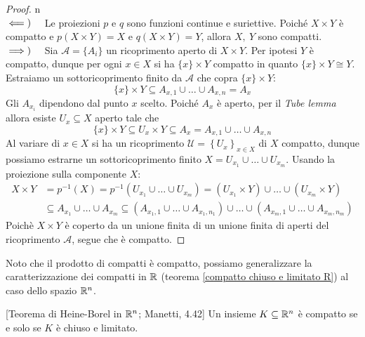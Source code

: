 \begin{proof}{n}~{}\\
	$\impliedby)\quad $ Le proiezioni $p$ e $q$ sono funzioni continue e suriettive. Poiché $X\times Y$ è compatto e $p\left(X\times Y\right)=X$ e $q\left(X\times Y\right)=Y$, allora $X,\ Y$ sono compatti. \\
	$\implies)\quad $ Sia $\mathcal{A}=\{A_i\}$ un ricoprimento aperto di $X\times Y$. Per ipotesi $Y$ è compatto, dunque per ogni $x\in X$ si ha $\{x\}\times Y$ compatto in quanto $\{x\}\times Y\cong Y$.
	Estraiamo un sottoricoprimento finito da $\mathcal{A}$ che copra $\{x\}\times Y$:
	\begin{equation*}
		\{x\}\times Y\subseteq A_{x,1}\cup\ldots\cup A_{x,n}=A_x
	\end{equation*}
	Gli $A_{x_i}$ dipendono dal punto $x$ scelto. Poiché $A_x$ è aperto, per il \textit{Tube lemma} allora esiste $U_x\subseteq X$ aperto tale che
		\begin{equation*}
			\{ x\}\times Y \subseteq U_x\times Y \subseteq A_x=A_{x,1}\cup\ldots\cup A_{x,n}
		\end{equation*}
	Al variare di $x\in X$ si ha un ricoprimento $\mathcal{U}=\left\{U_x\right\}_{x\in X}$ di $X$ compatto, dunque possiamo estrarne un sottoricoprimento finito $X=U_{x_1}\cup\ldots\cup U_{x_m}$. Usando la proiezione sulla componente $X$:
		\begin{align*}
				X\times Y &= p^{-1}(X)=p^{-1}\left( U_{x_1}\cup\ldots\cup U_{x_m}\right)= (U_{x_1}\times Y)\cup\ldots\cup (U_{x_m}\times Y)\\
				&\subseteq A_{x_1}\cup\ldots\cup A_{x_m} 
				\subseteq \left( A_{x_1 , 1}\cup\ldots\cup A_{x_1, n_1}\right) \cup\ldots\cup \left( A_{x_m, 1}\cup\ldots\cup A_{x_m, n_m} \right)
		\end{align*}
	Poichè $X\times Y$ è coperto da un unione finita di un unione finita di aperti del ricoprimento $\mathcal{A}$, segue che è compatto.\qedhere
\end{proof}
Noto che il prodotto di compatti è compatto, possiamo generalizzare la caratterizzazione dei compatti in $\mathbb{R}$ (teorema \ref{compatto chiuso e limitato R}) al caso dello spazio $\mathbb{R}^n$.
\begin{theorem}{}[Teorema di Heine-Borel in {$\mathbb{R}^n$}; Manetti, 4.42]\label{compatto chiuso e limitato R^n}
Un insieme $K\subseteq \mathbb{R}^n$ è compatto se e solo se $K$ è chiuso e limitato.
\end{theorem}
